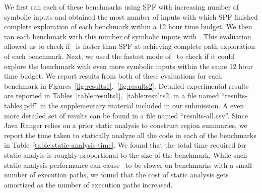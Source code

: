 We first ran each of these benchmarks using SPF with increasing number of symbolic inputs and obtained the most number of inputs
with which SPF finished complete exploration of each benchmark within a 12 hour time budget.
%
We then ran each benchmark with this number of symbolic inputs with \tool.
%
This evaluation allowed us to check if \tool\ is faster than SPF at achieving complete path exploration of each benchmark.
%
Next, we used the fastest mode of \tool\ to check if it could explore the benchmark with even more symbolic inputs within
the same 12 hour time budget.
%
We report results from both of these evaluations for each benchmark in Figures~\ref{fig:results1},~\ref{fig:results2}.
%
Detailed experimental results are reported in Tables~\ref{table:results1},~\ref{table:results2} in a file named
``results-tables.pdf'' in the supplementary material included in our submission.
%
A even more detailed set of results can be found in a file named ``results-all.csv''.
%
Since Java Ranger relies on a prior static analysis to construct region summaries, we report the time taken to statically
analyze all the code in each of the benchmarks in Table~\ref{table:static-analysis-time}.
%
We found that the total time required for static analyis is roughly proportional to the size of the benchmark.
%
While such static analysis performance can cause \tool\ to be slower on benchmarks with a small number of execution
paths, we found that the cost of static analysis gets amortized as the number of execution paths increased.
%
